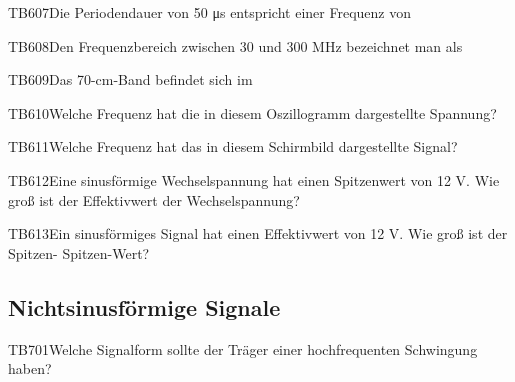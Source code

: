 \begin{question}{TB607}{Die Periodendauer von 50 μs entspricht einer Frequenz von}
\end{question}

\begin{question}{TB608}{Den Frequenzbereich zwischen 30 und 300 MHz bezeichnet man als}
\end{question}

\begin{question}{TB609}{Das 70-cm-Band befindet sich im}
\end{question}

\begin{question}{TB610}{Welche Frequenz hat die in diesem Oszillogramm dargestellte Spannung?}
\end{question}

\begin{question}{TB611}{Welche Frequenz hat das in diesem Schirmbild dargestellte Signal?}
\end{question}

\begin{question}{TB612}{Eine sinusförmige Wechselspannung hat einen Spitzenwert von 12 V. Wie groß ist der Effektivwert der Wechselspannung?}
\end{question}

\begin{question}{TB613}{Ein sinusförmiges Signal hat einen Effektivwert von 12 V. Wie groß ist der Spitzen- Spitzen-Wert?}
\end{question}

\subsection{Nichtsinusförmige Signale}

\begin{question}{TB701}{Welche Signalform sollte der Träger einer hochfrequenten Schwingung haben?}
\end{question}

